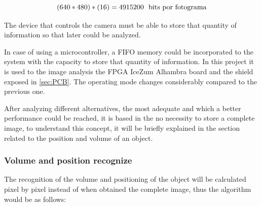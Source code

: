 \begin{equation}\label{eq:pixeles}
	(640*480)*(16) = 4915200  \ \ \textup{bits por fotograma} 
\end{equation}

The device that controls the camera must be able to store that quantity of information so that later could be analyzed. \newline

In case of using a microcontroller, a FIFO memory could be incorporated to the system with the capacity to store that quantity of information. In this project it is used to the image analysis the FPGA IceZum Alhambra board and the shield exposed in \ref{sec:PCB}. The operating mode changes considerably compared to the previous one. \newline

After analyzing different alternatives, the most adequate and which a better performance could be reached, it is based in the no necessity to store a complete image, to understand this concept, it will be briefly explained in the section related to the position and volume of an object.
\newpage
\subsubsection{Volume and position recognize}\label{sec:volumen}

The recognition of the volume and positioning of the object will be calculated pixel by pixel instead of when obtained the complete image, thus the algorithm would be as follows:

